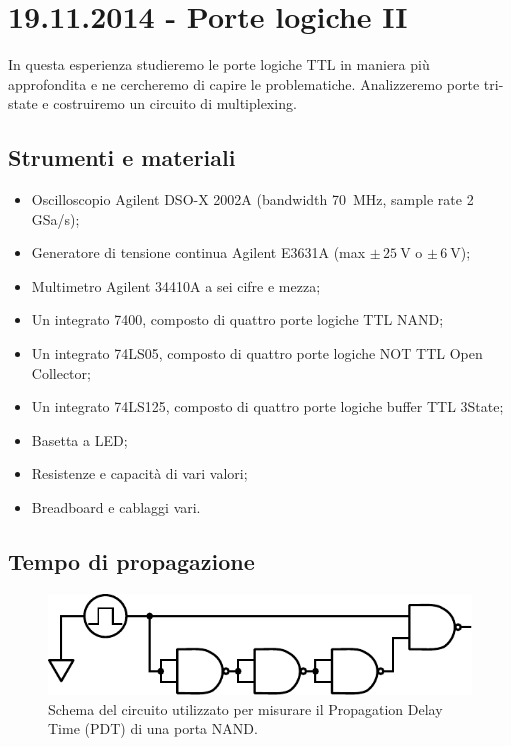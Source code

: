 \section{19.11.2014 - Porte logiche II}

In questa esperienza studieremo le porte logiche TTL in maniera più approfondita e ne cercheremo di capire le problematiche. Analizzeremo porte tri-state e costruiremo un circuito di multiplexing.

\subsection*{Strumenti e materiali}

\begin{itemize} [noitemsep]
	\item Oscilloscopio Agilent DSO-X 2002A (bandwidth \SI{70}{\mega\hertz}, sample rate \num{2} GSa/s);
	\item Generatore di tensione continua Agilent E3631A (max $\pm \, \SI{25}{\volt}$ o $\pm \, \SI{6}{\volt}$);
	\item Multimetro Agilent 34410A a sei cifre e mezza;
	\item Un integrato 7400, composto di quattro porte logiche TTL NAND; %
	\item Un integrato 74LS05, composto di quattro porte logiche NOT TTL Open Collector;
	\item Un integrato 74LS125, composto di quattro porte logiche buffer TTL 3State;
	\item Basetta a LED;		
	\item Resistenze e capacità di vari valori;
	\item Breadboard e cablaggi vari.
\end{itemize}

\subsection{Tempo di propagazione}

\begin{figure}
\centering
\includegraphics[width=.4\textwidth]{../E10/latex/delay.pdf}
\caption{Schema del circuito utilizzato per misurare il Propagation Delay Time (PDT) di una porta NAND.}
\label{cir10:delay}
\end{figure}


